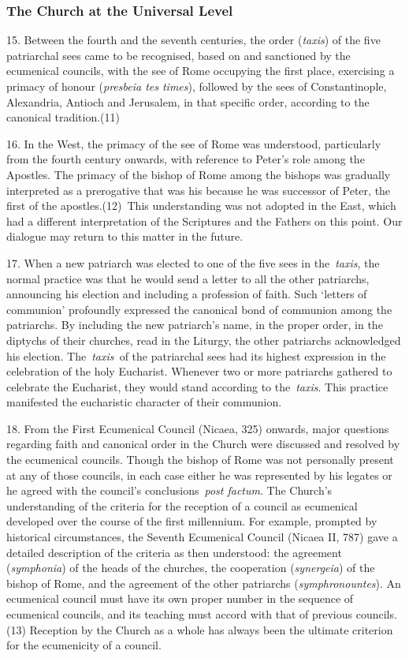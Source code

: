 \subsubsection{The Church at the Universal
Level}\label{the-church-at-the-universal-level}

15. Between the fourth and the seventh centuries, the order
(\emph{taxis}) of the five patriarchal sees came to be recognised, based
on and sanctioned by the ecumenical councils, with the see of Rome
occupying the first place, exercising a primacy of honour
(\emph{presbeia tes times}), followed by the sees of Constantinople,
Alexandria, Antioch and Jerusalem, in that specific order, according to
the canonical tradition.(11)

16. In the West, the primacy of the see of Rome was understood,
particularly from the fourth century onwards, with reference to Peter's
role among the Apostles. The primacy of the bishop of Rome among the
bishops was gradually interpreted as a prerogative that was his because
he was successor of Peter, the first of the apostles.(12)~This
understanding was not adopted in the East, which had a different
interpretation of the Scriptures and the Fathers on this point. Our
dialogue may return to this matter in the future.

17. When a new patriarch was elected to one of the five sees in
the~\emph{taxis}, the normal practice was that he would send a letter to
all the other patriarchs, announcing his election and including a
profession of faith. Such `letters of communion' profoundly expressed
the canonical bond of communion among the patriarchs. By including the
new patriarch's name, in the proper order, in the diptychs of their
churches, read in the Liturgy, the other patriarchs acknowledged his
election. The~\emph{taxis~}of the patriarchal sees had its highest
expression in the celebration of the holy Eucharist. Whenever two or
more patriarchs gathered to celebrate the Eucharist, they would stand
according to the~\emph{taxis}. This practice manifested the eucharistic
character of their communion.

18. From the First Ecumenical Council (Nicaea, 325) onwards, major
questions regarding faith and canonical order in the Church were
discussed and resolved by the ecumenical councils. Though the bishop of
Rome was not personally present at any of those councils, in each case
either he was represented by his legates or he agreed with the council's
conclusions~\emph{post factum}. The Church's understanding of the
criteria for the reception of a council as ecumenical developed over the
course of the first millennium. For example, prompted by historical
circumstances, the Seventh Ecumenical Council (Nicaea II, 787) gave a
detailed description of the criteria as then understood: the agreement
(\emph{symphonia}) of the heads of the churches, the cooperation
(\emph{synergeia}) of the bishop of Rome, and the agreement of the other
patriarchs (\emph{symphronountes}). An ecumenical council must have its
own proper number in the sequence of ecumenical councils, and its
teaching must accord with that of previous councils.(13) Reception by
the Church as a whole has always been the ultimate criterion for the
ecumenicity of a council.

